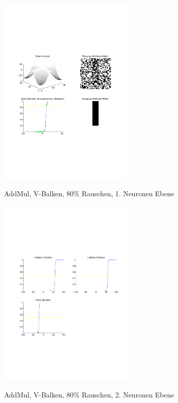 \begin{figure}[hbt]
	\begin{minipage}[c]{\textwidth}
		\centering
       	\includegraphics[trim=71 213 43 212, clip, width=0.58\textwidth]{./Bilder/Auswertung/Endergebnis/TypeAddMul_Rauschen80_V_Line_Layer1}
		\caption{AddMul, V-Balken, 80\% Rauschen, 1. Neuronen Ebene}
		\label{AddMul_V_80_1}
		\vfill
		\includegraphics[trim=71 213 43 212, clip, width=0.58\textwidth]{./Bilder/Auswertung/Endergebnis/TypeAddMul_Rauschen80_V_Line_Layer2}
		\caption{AddMul, V-Balken, 80\% Rauschen, 2. Neuronen Ebene}
		\label{AddMul_V_80_2}
	\end{minipage}
\end{figure}
\clearpage

